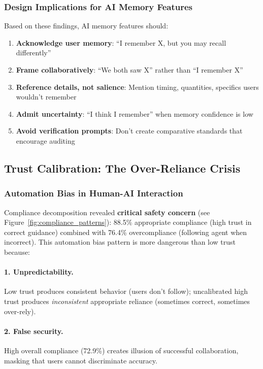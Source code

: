 \documentclass[12pt]{article}
\begin{document}
\subsubsection{Design Implications for AI Memory Features}

Based on these findings, AI memory features should:

\begin{enumerate}
    \item \textbf{Acknowledge user memory}: ``I remember X, but you may recall differently''
    \item \textbf{Frame collaboratively}: ``We both saw X'' rather than ``I remember X''
    \item \textbf{Reference details, not salience}: Mention timing, quantities, specifics users wouldn't remember
    \item \textbf{Admit uncertainty}: ``I think I remember'' when memory confidence is low
    \item \textbf{Avoid verification prompts}: Don't create comparative standards that encourage auditing
\end{enumerate}

\subsection{Trust Calibration: The Over-Reliance Crisis}

\subsubsection{Automation Bias in Human-AI Interaction}

Compliance decomposition revealed \textbf{critical safety concern} (see Figure~\ref{fig:compliance_patterns}): 88.5\% appropriate compliance (high trust in correct guidance) combined with 76.4\% overcompliance (following agent when incorrect). This automation bias pattern \citep{parasuraman2010automation} is more dangerous than low trust because:

\paragraph{1. Unpredictability.} Low trust produces consistent behavior (users don't follow); uncalibrated high trust produces \textit{inconsistent} appropriate reliance (sometimes correct, sometimes over-rely).

\paragraph{2. False security.} High overall compliance (72.9\%) creates illusion of successful collaboration, masking that users cannot discriminate accuracy.
\end{document}
